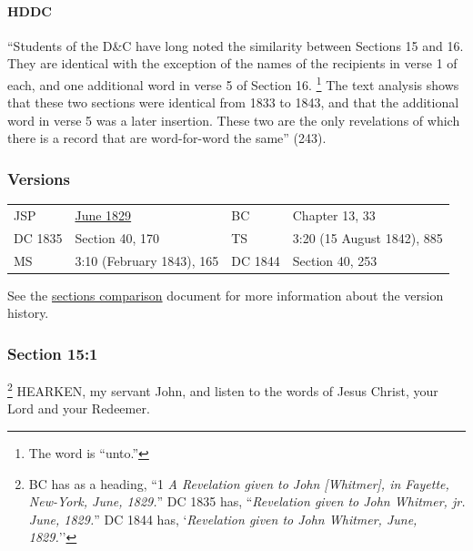 		\paragraph{HDDC}
		
			``Students of the D\&C have long noted the similarity between Sections 15 and 16. They are identical with the exception of the names of the recipients in verse 1 of each, and one additional word in verse 5 of Section 16.%
				\footnote{%
					The word is ``unto.''
					}
			The text analysis shows that these two sections were identical from 1833 to 1843, and that the additional word in verse 5 was a later insertion. These two are the only revelations of which there is a record that are word-for-word the same'' (243).
			
	\subsubsection{Versions}
		\label{DC15-V}
	
		\begin{tabular}{p{1in}p{2in}p{1in}p{2in}}
			JSP		& \hyperref[EMS-1828-1829-JS-JUN-1829-C]{June 1829}	& BC & Chapter 13, 33 \\
			DC 1835	& Section 40, 170									& TS & 3:20 (15 August 1842), 885 \\
			MS		& 3:10 (February 1843), 165							& DC 1844 & Section 40, 253 \\
		\end{tabular}
		
		\medskip
		
		See the \href{https://drive.google.com/file/d/1goAvNz8jS4R8slYfMG_db55Ty2z_vmgK/view?usp=sharing}{sections comparison} document for more information about the version history.

	\subsubsection{Section 15:1} %
		\label{DC15-1}

			\footnote{%
				BC has as a heading, ``1 \textit{A Revelation given to John [Whitmer], in Fayette, New-York, June, 1829.}'' DC 1835 has, ``\textit{Revelation given to John Whitmer, jr. June, 1829.}'' DC 1844 has, `\textit{Revelation given to John Whitmer, June, 1829.}''
				}
		HEARKEN, my servant John, and listen to the words of Jesus Christ, your Lord and your Redeemer.


